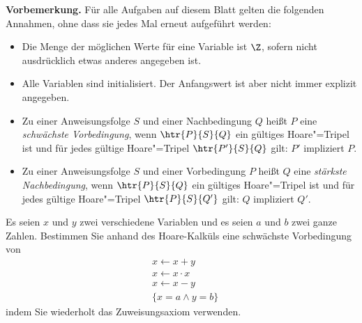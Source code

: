 \documentclass[12pt]{article}
\begin{document}

\noindent
\textbf{Vorbemerkung.} Für alle Aufgaben auf diesem Blatt gelten die
folgenden Annahmen, ohne dass sie jedes Mal erneut aufgeführt werden:
\begin{itemize}[nosep]
\item Die Menge der möglichen Werte für eine Variable ist $\Z$, sofern
  nicht ausdrücklich etwas anderes angegeben ist.
\item Alle Variablen sind initialisiert. Der Anfangswert ist aber
  nicht immer explizit angegeben.
\item Zu einer Anweisungsfolge $S$ und einer Nachbedingung $Q$ heißt
  $P$ eine \emph{schwächste Vorbedingung}, wenn $\htr{P}{S}{Q}$ ein
  gültiges Hoare"=Tripel ist und für jedes gültige Hoare"=Tripel
  $\htr{P'}{S}{Q}$ gilt: $P'$ impliziert $P$.
\item Zu einer Anweisungsfolge $S$ und einer Vorbedingung $P$ heißt
  $Q$ eine \emph{stärkste Nachbedingung}, wenn $\htr{P}{S}{Q}$ ein
  gültiges Hoare"=Tripel ist und für jedes gültige Hoare"=Tripel
  $\htr{P}{S}{Q'}$ gilt: $Q$ impliziert $Q'$.
\end{itemize}

\vspace*{\baselineskip}


\begin{aufgabe}[4]
  Es seien $x$ und $y$ zwei verschiedene Variablen und es seien $a$ und $b$ zwei ganze Zahlen. Bestimmen Sie anhand des Hoare-Kalküls eine schwächste Vorbedingung von
  \begin{align*}
    & x \gets x + y \\
    & x \gets x \cdot x \\
    & x \gets x - y \\
    & \{ x = a \land y = b \}
  \end{align*}
  indem Sie wiederholt das Zuweisungsaxiom verwenden.
\end{aufgabe}
\end{document}
